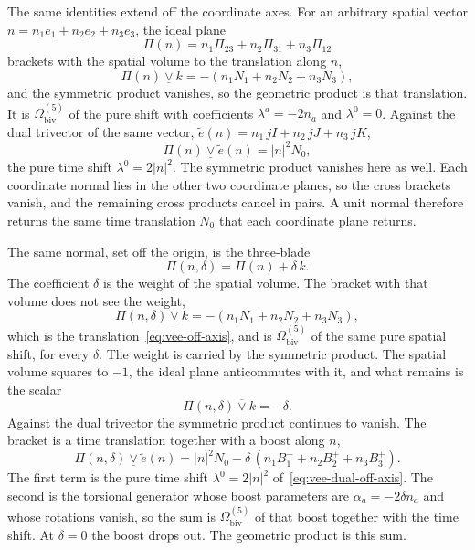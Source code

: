 \documentclass[a4paper]{article}
\begin{document}
The same identities extend off the coordinate axes. For an arbitrary spatial vector \(n=n_{1}e_{1}+n_{2}e_{2}+n_{3}e_{3}\), the ideal plane
\begin{equation}
\label{eq:plane-off-axis}
\Pi(n)=n_{1}\Pi_{23}+n_{2}\Pi_{31}+n_{3}\Pi_{12}
\end{equation}
brackets with the spatial volume to the translation along \(n\),
\begin{equation}
\label{eq:vee-off-axis}
\Pi(n)\mathbin{\underline{\vee}} k=-(n_{1}N_{1}+n_{2}N_{2}+n_{3}N_{3}),
\end{equation}
and the symmetric product vanishes, so the geometric product is that translation. It is \(\Omega_{\mathrm{biv}}^{(5)}\) of the pure shift with coefficients \(\lambda^{a}=-2n_{a}\) and \(\lambda^{0}=0\). Against the dual trivector of the same vector, \(\tilde{e}(n)=n_{1}\,jI+n_{2}\,jJ+n_{3}\,jK\),
\begin{equation}
\label{eq:vee-dual-off-axis}
\Pi(n)\mathbin{\underline{\vee}}\tilde{e}(n)=|n|^{2}N_{0},
\end{equation}
the pure time shift \(\lambda^{0}=2|n|^{2}\). The symmetric product vanishes here as well. Each coordinate normal lies in the other two coordinate planes, so the cross brackets vanish, and the remaining cross products cancel in pairs. A unit normal therefore returns the same time translation \(N_{0}\) that each coordinate plane returns.

The same normal, set off the origin, is the three-blade
\begin{equation}
\label{eq:plane-displaced}
\Pi(n,\delta)=\Pi(n)+\delta\,k.
\end{equation}
The coefficient \(\delta\) is the weight of the spatial volume. The bracket with that volume does not see the weight,
\begin{equation}
\label{eq:vee-displaced}
\Pi(n,\delta)\mathbin{\underline{\vee}} k=-(n_{1}N_{1}+n_{2}N_{2}+n_{3}N_{3}),
\end{equation}
which is the translation~\eqref{eq:vee-off-axis}, and is \(\Omega_{\mathrm{biv}}^{(5)}\) of the same pure spatial shift, for every \(\delta\). The weight is carried by the symmetric product. The spatial volume squares to \(-1\), the ideal plane anticommutes with it, and what remains is the scalar
\begin{equation}
\label{eq:sym-displaced}
\Pi(n,\delta)\mathbin{\overline{\vee}} k=-\delta.
\end{equation}
Against the dual trivector the symmetric product continues to vanish. The bracket is a time translation together with a boost along \(n\),
\begin{equation}
\label{eq:vee-displaced-dual}
\Pi(n,\delta)\mathbin{\underline{\vee}}\tilde{e}(n)=|n|^{2}N_{0}-\delta\,(n_{1}B^{+}_{1}+n_{2}B^{+}_{2}+n_{3}B^{+}_{3}).
\end{equation}
The first term is the pure time shift \(\lambda^{0}=2|n|^{2}\) of~\eqref{eq:vee-dual-off-axis}. The second is the torsional generator whose boost parameters are \(\alpha_{a}=-2\delta n_{a}\) and whose rotations vanish, so the sum is \(\Omega_{\mathrm{biv}}^{(5)}\) of that boost together with the time shift. At \(\delta=0\) the boost drops out. The geometric product is this sum.
\end{document}
